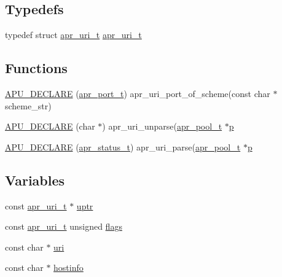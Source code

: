 \subsection*{Typedefs}
\begin{DoxyCompactItemize}
\item 
typedef struct \hyperlink{structapr__uri__t}{apr\+\_\+uri\+\_\+t} \hyperlink{group__APR__Util__URI_ga44e5978712bd6ff4fb65314346c01392}{apr\+\_\+uri\+\_\+t}
\end{DoxyCompactItemize}
\subsection*{Functions}
\begin{DoxyCompactItemize}
\item 
\hyperlink{group__APR__Util__URI_ga316c03099df74f0279320d4ce2647e1c}{A\+P\+U\+\_\+\+D\+E\+C\+L\+A\+RE} (\hyperlink{group__apr__network__io_gaa670a71960f6eb4fe0d0de2a1e7aba03}{apr\+\_\+port\+\_\+t}) apr\+\_\+uri\+\_\+port\+\_\+of\+\_\+scheme(const char $\ast$scheme\+\_\+str)
\item 
\hyperlink{group__APR__Util__URI_ga77edf027bf69f056e5cd4342dbf8ca77}{A\+P\+U\+\_\+\+D\+E\+C\+L\+A\+RE} (char $\ast$) apr\+\_\+uri\+\_\+unparse(\hyperlink{structapr__pool__t}{apr\+\_\+pool\+\_\+t} $\ast$\hyperlink{group__APACHE__CORE__MPM_ga5cd91701e5c167f2b1a38e70ab57817e}{p}
\item 
\hyperlink{group__APR__Util__URI_ga1cf262765b80ae6fde3e6817fb0775ef}{A\+P\+U\+\_\+\+D\+E\+C\+L\+A\+RE} (\hyperlink{group__apr__errno_gaa5105fa83cc322f09382292db8b47593}{apr\+\_\+status\+\_\+t}) apr\+\_\+uri\+\_\+parse(\hyperlink{structapr__pool__t}{apr\+\_\+pool\+\_\+t} $\ast$\hyperlink{group__APACHE__CORE__MPM_ga5cd91701e5c167f2b1a38e70ab57817e}{p}
\end{DoxyCompactItemize}
\subsection*{Variables}
\begin{DoxyCompactItemize}
\item 
const \hyperlink{structapr__uri__t}{apr\+\_\+uri\+\_\+t} $\ast$ \hyperlink{group__APR__Util__URI_ga2fb66bf6ec8c67eb2b16f6ffde9952a8}{uptr}
\item 
const \hyperlink{structapr__uri__t}{apr\+\_\+uri\+\_\+t} unsigned \hyperlink{group__APR__Util__URI_gad0e5d525fb6ef9a518656fa71faa91eb}{flags}
\item 
const char $\ast$ \hyperlink{group__APR__Util__URI_ga69ec24fb2d0a5f5e532deb9adaab81d6}{uri}
\item 
const char $\ast$ \hyperlink{group__APR__Util__URI_ga2b9a5e4287719404cfa1b1a328bd2385}{hostinfo}
\end{DoxyCompactItemize}


